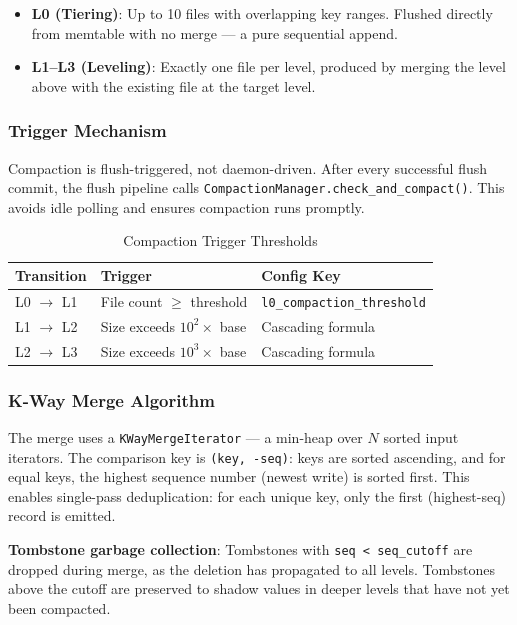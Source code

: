 \documentclass[conference]{IEEEtran}
\begin{document}
\begin{itemize}[leftmargin=*]
    \item \textbf{L0 (Tiering)}: Up to 10 files with overlapping key ranges. Flushed directly from memtable with no merge --- a pure sequential append.
    \item \textbf{L1--L3 (Leveling)}: Exactly one file per level, produced by merging the level above with the existing file at the target level.
\end{itemize}

\subsubsection{Trigger Mechanism}

Compaction is flush-triggered, not daemon-driven. After every successful flush commit, the flush pipeline calls \texttt{CompactionManager.check\_and\_compact()}. This avoids idle polling and ensures compaction runs promptly.

\begin{table}[H]
\centering
\caption{Compaction Trigger Thresholds}
\label{tab:compact}
\begin{tabular}{@{}lll@{}}
\toprule
\textbf{Transition} & \textbf{Trigger} & \textbf{Config Key} \\
\midrule
L0 $\rightarrow$ L1 & File count $\geq$ threshold & \texttt{l0\_compaction\_threshold} \\
L1 $\rightarrow$ L2 & Size exceeds $10^2 \times$ base & Cascading formula \\
L2 $\rightarrow$ L3 & Size exceeds $10^3 \times$ base & Cascading formula \\
\bottomrule
\end{tabular}
\end{table}

\subsubsection{K-Way Merge Algorithm}

The merge uses a \texttt{KWayMergeIterator} --- a min-heap over $N$ sorted input iterators. The comparison key is \texttt{(key, -seq)}: keys are sorted ascending, and for equal keys, the highest sequence number (newest write) is sorted first. This enables single-pass deduplication: for each unique key, only the first (highest-seq) record is emitted.

\textbf{Tombstone garbage collection}: Tombstones with \texttt{seq < seq\_cutoff} are dropped during merge, as the deletion has propagated to all levels. Tombstones above the cutoff are preserved to shadow values in deeper levels that have not yet been compacted.
\end{document}
